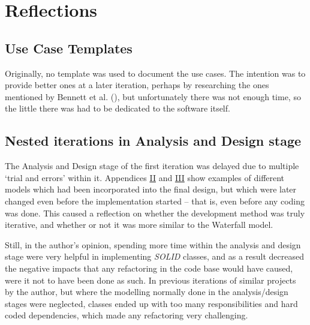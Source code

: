 \section{Reflections} \label{sec:Reflections}

\subsection{Use Case Templates} \label{sec:Reflections.UseCaseTemplates}
Originally, no template was used to document the use cases. The intention was
to provide better ones at a later iteration, perhaps by researching the ones
mentioned by Bennett et al. (\citeyear[][p.~157]{bennett2010object}), but
unfortunately there was not enough time, so the little there was had to be
dedicated to the software itself.

\subsection{Nested iterations in Analysis and Design stage}
The Analysis and Design stage of the first iteration was delayed due to
multiple `trial and errors' within it. Appendices \hyperref[appendix2]{II} and
\hyperref[appendix3]{III} show examples of different models which had been
incorporated into the final design, but which were later changed even before
the implementation started -- that is, even before any coding was done. This
caused a reflection on whether the development method was truly iterative, and
whether or not it was more similar to the Waterfall model.

Still, in the author's opinion, spending more time within the analysis and
design stage were very helpful in implementing \emph{SOLID} classes, and as a
result decreased the negative impacts that any refactoring in the code base
would have caused, were it not to have been done as such. In previous
iterations of similar projects by the author, but where the modelling normally
done in the analysis/design stages were neglected, classes ended up with too
many responsibilities and hard coded dependencies, which made any refactoring
very challenging.


